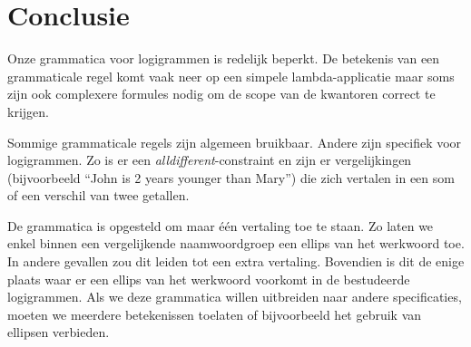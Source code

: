 \section{Conclusie}
Onze grammatica voor logigrammen is redelijk beperkt. De betekenis van een grammaticale regel komt vaak neer op een simpele lambda-applicatie maar soms zijn ook complexere formules nodig om de scope van de kwantoren correct te krijgen.

Sommige grammaticale regels zijn algemeen bruikbaar. Andere zijn specifiek voor logigrammen. Zo is er een \textit{alldifferent}-constraint en zijn er vergelijkingen (bijvoorbeeld ``John is 2 years younger than Mary'') die zich vertalen in een som of een verschil van twee getallen.

De grammatica is opgesteld om maar één vertaling toe te staan. Zo laten we enkel binnen een vergelijkende naamwoordgroep een ellips van het werkwoord toe. In andere gevallen zou dit leiden tot een extra vertaling. Bovendien is dit de enige plaats waar er een ellips van het werkwoord voorkomt in de bestudeerde logigrammen. Als we deze grammatica willen uitbreiden naar andere specificaties, moeten we meerdere betekenissen toelaten of bijvoorbeeld het gebruik van ellipsen verbieden.
